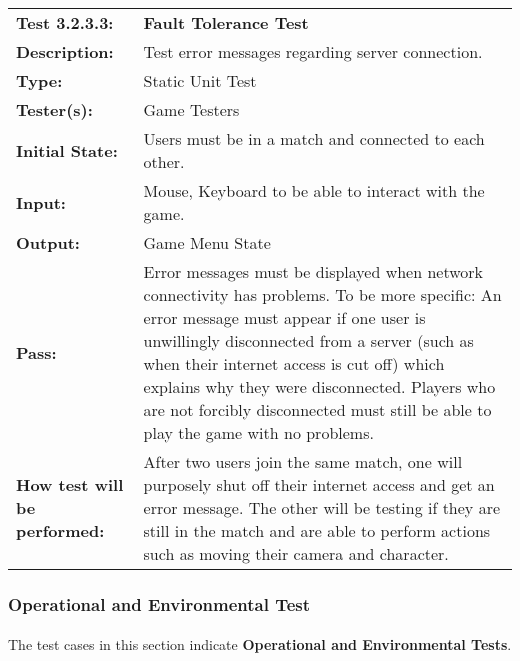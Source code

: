 \documentclass[12pt, titlepage]{article}
\begin{document}
\begin{mdframed}[linewidth=1pt]
\begin{tabularx}{\textwidth}{@{}p{3cm}X@{}}
{\bf Test 3.2.3.3:} & {\bf Fault Tolerance Test}\\[\baselineskip]
{\bf Description:} & Test error messages regarding server connection.\\[0.5\baselineskip]
{\bf Type:} & Static Unit Test\\[0.5\baselineskip]
{\bf Tester(s):} & Game Testers\\[0.5\baselineskip]
{\bf Initial State:} & Users must be in a match and connected to each other.\\[0.5\baselineskip]
{\bf Input:} & Mouse, Keyboard to be able to interact with the game.\\[0.5\baselineskip]
{\bf Output:} & Game Menu State\\[0.5\baselineskip]
{\bf Pass:} & Error messages must be displayed when network connectivity has problems. To be more specific: An error message must appear if one user is unwillingly disconnected from a server (such as when their internet access is cut off) which explains why they were disconnected. Players who are not forcibly disconnected must still be able to play the game with no problems.\\[0.5\baselineskip]
{\bf How test will be performed:} & After two users join the same match, one will purposely shut off their internet access and get an error message. The other will be testing if they are still in the match and are able to perform actions such as moving their camera and character. 
\end{tabularx}
\end{mdframed}

\newpage
\subsubsection{Operational and Environmental Test}
\paragraph{}The test cases in this section indicate \textbf{Operational and Environmental Tests}.
\end{document}
